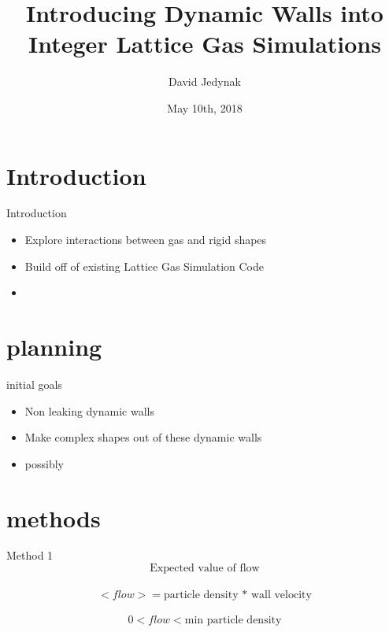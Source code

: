 \documentclass{beamer}
\title[Introducing Dynamic Walls into Integer Lattice Gas Simulations]{Introducing Dynamic Walls into Integer Lattice Gas Simulations}
\author{David Jedynak}
\institute{NDSU}
\date{May 10th, 2018}
\begin{document}
\begin{frame}
  \titlepage
\end{frame}


\section{Introduction}

\begin{frame}{Introduction}

\begin{itemize}
  \item Explore interactions between gas and rigid shapes
  \item Build off of existing Lattice Gas Simulation Code
  \item 
\end{itemize}

\vskip 1cm

\end{frame}

\section{planning}
\begin{frame}{initial goals}
\begin{itemize}
\item Non leaking dynamic walls
\item Make complex shapes out of these dynamic walls
\item possibly 
\end{itemize}
\end{frame}
\section{methods}
\begin{frame}{Method 1}
$$
\textrm{Expected value of flow}$$\\
$$<flow> = \textrm{particle density * wall velocity}$$\\
$$0 < flow < \textrm{min particle density}$$\\
\end{frame}
\end{document}

